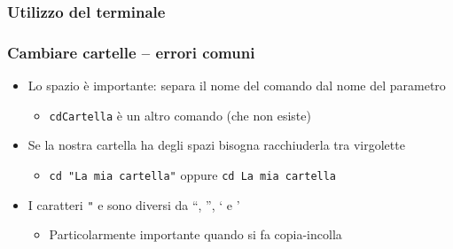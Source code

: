 \begin{exampleframe}
    \frametitle{Utilizzo del terminale}
    \frametitle{Cambiare cartelle -- errori comuni}

    \centering
    \bigskip
    
    \begin{itemize}
        \item Lo spazio è importante: separa il nome del comando dal nome del parametro
        \begin{itemize}
            \item \texttt{cdCartella} è un altro comando (che non esiste)
        \end{itemize}
        \bigskip
        
        \item Se la nostra cartella ha degli spazi bisogna racchiuderla tra virgolette
        \begin{itemize}
            \item \texttt{cd "La mia cartella"} oppure \texttt{cd \textquotesingle{}La mia cartella\textquotesingle{}} 
        \end{itemize}
        
        \bigskip
        \item I caratteri \texttt{"} e \texttt{\textquotesingle{}} sono diversi da ``, '', ` e '
        \begin{itemize}
            \item Particolarmente importante quando si fa copia-incolla
        \end{itemize}
    \end{itemize}
\end{exampleframe}

